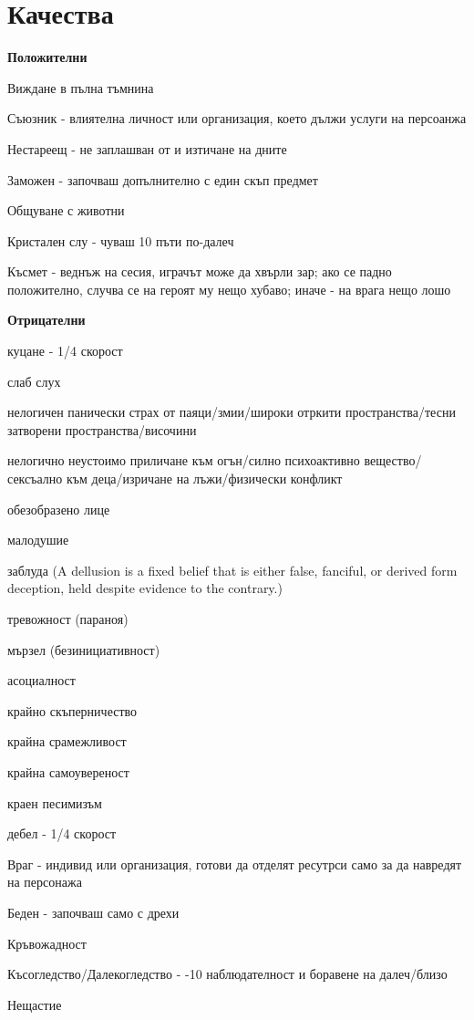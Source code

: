 \chapter{Качества}

\textbf{Положителни}
\begin{itemize*}
\item{Виждане в пълна тъмнина}
\item{Съюзник - влиятелна личност или организация, което дължи услуги на персоанжа}
\item{Нестареещ - не заплашван от и изтичане на дните}
\item{Заможен - започваш допълнително с един скъп предмет}
\item{Общуване с животни}
\item{Кристален слу - чуваш 10 пъти по-далеч}
\item{Късмет - веднъж на сесия, играчът може да хвърли зар; ако се падно положително, случва се на героят му нещо хубаво; иначе - на врага нещо лошо}
\end{itemize*}

\vspace{0.7cm}
\textbf{Отрицателни}
\begin{itemize*}
\item{куцане - 1/4 скорост}
\item{слаб слух}
\item{нелогичен панически страх от паяци/змии/широки отркити пространства/тесни затворени пространства/височини}
\item{нелогично неустоимо приличане към огън/силно психоактивно вещество/сексъално към деца/изричане на лъжи/физически конфликт}
\item{обезобразено лице}
\item{малодушие}
\item{заблуда (A dellusion is a fixed belief that is either false, fanciful, or derived form deception, held despite evidence to the contrary.)}
\item{тревожност (параноя)}
\item{мързел (безинициативност)}
\item{асоциалност}
\item{крайно скъперничество}
\item{крайна срамежливост}
\item{крайна самоувереност}
\item{краен песимизъм}
\item{дебел - 1/4 скорост}
\item{Враг - индивид или организация, готови да отделят ресутрси само за да навредят на персонажа}
\item{Беден - започваш само с дрехи}
\item{Кръвожадност}
\item{Късогледство/Далекогледство - -10 наблюдателност и боравене на далеч/близо}
\item{Нещастие}
\end{itemize*}

